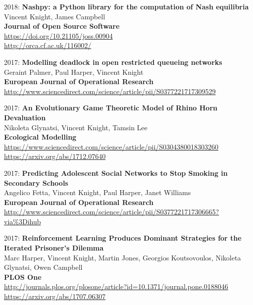 \documentclass[10pt]{res} %
\begin{document}
\begin{resume}
\begin{etaremune}
\item
2018: \textbf{Nashpy: a Python library for the computation of Nash equilibria}\\
Vincent Knight, James Campbell
\\
\textbf{Journal of Open Source Software}
\\
\url{https://doi.org/10.21105/joss.00904}
\\
\url{http://orca.cf.ac.uk/116002/}
\\

\item
2017: \textbf{Modelling deadlock in open restricted queueing networks}\\
Geraint Palmer, Paul Harper, Vincent Knight
\\
\textbf{European Journal of Operational Research}
\\
\url{http://www.sciencedirect.com/science/article/pii/S0377221717309529}
\\

\item
2017: \textbf{An Evolutionary Game Theoretic Model of Rhino Horn Devaluation}\\
Nikoleta Glynatsi, Vincent Knight, Tamsin Lee
\\
\textbf{Ecological Modelling}
\\
\url{https://www.sciencedirect.com/science/article/pii/S0304380018303260}
\\
\url{https://arxiv.org/abs/1712.07640}
\\

\item
2017: \textbf{Predicting Adolescent Social Networks to Stop Smoking in Secondary Schools}\\
Angelico Fetta, Vincent Knight, Paul Harper, Janet Williams
\\
\textbf{European Journal of Operational Research}
\\
\url{http://www.sciencedirect.com/science/article/pii/S0377221717306665?via%3Dihub}
\\

\item
2017: \textbf{Reinforcement Learning Produces Dominant Strategies for the Iterated Prisoner's Dilemma}\\
Marc Harper, Vincent Knight, Martin Jones, Georgios Koutsovoulos, Nikoleta Glynatsi, Owen Campbell
\\
\textbf{PLOS One}
\\
\url{http://journals.plos.org/plosone/article?id=10.1371/journal.pone.0188046}
\\
\url{https://arxiv.org/abs/1707.06307}
\\


\end{etaremune}
\end{resume}
\end{document}
